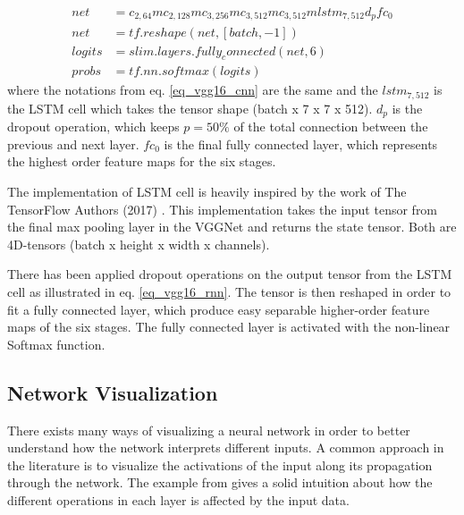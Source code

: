 \begin{equation}
\begin{aligned}
net &= c_{2,64}mc_{2,128}mc_{3,256}mc_{3,512}mc_{3,512}m lstm_{7,512} d_p fc_0\\
net &=  tf.reshape(net, [batch, -1])\\
logits &= slim.layers.fully_connected(net, 6) \\
probs &= tf.nn.softmax(logits)
\end{aligned}
\label{eq_vgg16_rnn}
\end{equation}
where the notations from eq. \ref{eq_vgg16_cnn} are the same and the $lstm_{7,512}$ is the LSTM cell   which takes the tensor shape (batch x 7 x 7 x 512). $d_p$ is the dropout operation, which keeps  $p = 50\%$ of the total connection between the previous and next layer. $fc_0$ is the final fully connected layer, which represents the highest order feature maps for the six stages.

The implementation of LSTM cell is heavily inspired by the work of The TensorFlow Authors (2017) \cite{git_lstm}. This implementation takes the input tensor from the final max pooling layer in the VGGNet and returns the state tensor. Both are 4D-tensors (batch x height x width x channels).

There has been applied dropout operations on the output tensor from the LSTM cell as illustrated in eq. \ref{eq_vgg16_rnn}. The tensor is then reshaped in order to fit a fully connected layer, which produce easy separable higher-order feature maps of the six stages. The fully connected layer is activated with the non-linear Softmax function.

\subsection{Network Visualization}

There exists many ways of visualizing a neural network in order to better understand how the network interprets different inputs.  
A common approach in the literature is to visualize the activations of the input along its propagation through the network. 
The example from \cite{stand_cnn} gives a solid intuition about how the different operations in each layer is affected by the input data.

